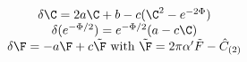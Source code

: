 \begin{equation}
\begin{array}{c}
\delta \C = 2a\C + b - c(\C^2-e^{-2\Phi}) \\
\delta(e^{-\Phi/2}) = e^{-\Phi/2}(a-c\C) \\
\delta\F = -a\F + c{\tilde\F}
  \text{ with } {\tilde\F}=2\pi\alpha'{\tilde F}-\hat{C}_{(2)}
\end{array}
\end{equation}

